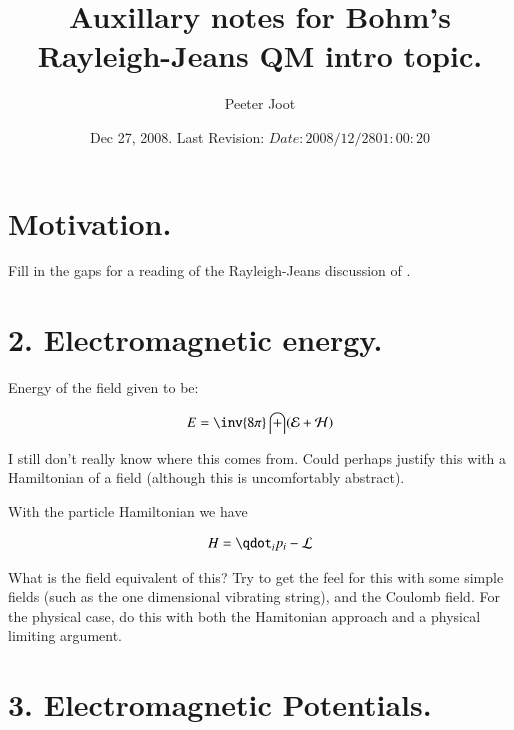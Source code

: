 \documentclass{article}
\title{ Auxillary notes for Bohm's Rayleigh-Jeans QM intro topic. }
\author{Peeter Joot}
\date{ Dec 27, 2008.  Last Revision: $Date: 2008/12/28 01:00:20 $ }
\newcommand{\EE}[0]{\mathcal{E}}
\newcommand{\HH}[0]{\mathcal{H}}
\begin{document}
\maketitle{}


\section{ Motivation. }

Fill in the gaps for a reading of the
Rayleigh-Jeans discussion of \cite{bohm1989qt}.

\section{ 2. Electromagnetic energy. }

Energy of the field given to be:

\begin{align*}
E = \inv{8\pi} \int (\EE + \HH)
\end{align*}

I still don't really know where this comes from.
Could perhaps justify this with a Hamiltonian of a field (although this is
uncomfortably abstract).

With the particle Hamiltonian we have

\begin{align*}
H = \qdot_i p_i -\LL
\end{align*}

What is the field equivalent of this?  Try to get the feel for this with some simple fields (such as the one dimensional vibrating string), and the Coulomb field.  For the physical case, do this with both the Hamitonian approach and a physical limiting argument.

\section{ 3. Electromagnetic Potentials. }



\end{document}
